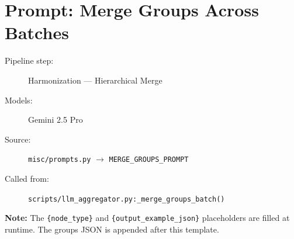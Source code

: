 \section*{Prompt: Merge Groups Across Batches}
\begin{description}
\item[Pipeline step:] Harmonization --- Hierarchical Merge
\item[Models:] Gemini 2.5 Pro
\item[Source:] \texttt{misc/prompts.py} $\rightarrow$ \texttt{MERGE\_GROUPS\_PROMPT}
\item[Called from:] \texttt{scripts/llm\_aggregator.py:\_merge\_groups\_batch()}
\end{description}
\begin{tcolorbox}[colback=yellow!8,colframe=yellow!50!black,left=4pt,right=4pt,top=4pt,bottom=4pt,arc=2pt]
\textbf{Note:} The \texttt{\{node\_type\}} and \texttt{\{output\_example\_json\}} placeholders are filled at runtime. The groups JSON is appended after this template.
\end{tcolorbox}

